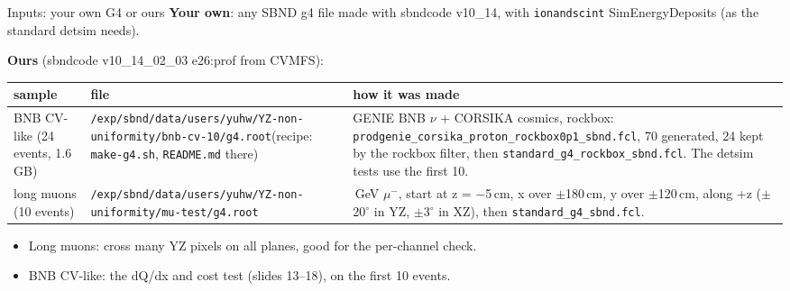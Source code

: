 \documentclass[aspectratio=169,10pt]{beamer}
\newcommand{\code}[1]{\texttt{#1}}
\begin{document}
\begin{frame}{Inputs: your own G4 or ours}
\small
\textbf{Your own}: any SBND g4 file made with sbndcode v10\_14, with \code{ionandscint} SimEnergyDeposits (as the standard detsim needs).
\vspace{2mm}

\textbf{Ours} (sbndcode v10\_14\_02\_03 e26:prof from CVMFS):
\vspace{1mm}
\centering\footnotesize
\begin{tabular}{@{}>{\raggedright\arraybackslash}p{}>{\raggedright\arraybackslash}p{}>{\raggedright\arraybackslash}p{}@{}}
\toprule
sample & file & how it was made \\
\midrule
BNB CV-like (24 events, 1.6\,GB) & \code{/exp/sbnd/data/users/yuhw/}\newline\code{YZ-non-uniformity/bnb-cv-10/g4.root}\newline(recipe: \code{make-g4.sh}, \code{README.md} there) &
GENIE BNB $\nu$ + CORSIKA cosmics, rockbox: {\scriptsize\code{prodgenie\_corsika\_proton\_rockbox0p1\_sbnd.fcl}}, 70 generated, 24 kept by the rockbox filter, then \code{standard\_g4\_rockbox\_sbnd.fcl}. The detsim tests use the first 10. \\
\addlinespace
long muons (10 events) & \code{/exp/sbnd/data/users/yuhw/}\newline\code{YZ-non-uniformity/mu-test/g4.root} &
5\,GeV $\mu^-$, start at z = $-$5\,cm, x over $\pm$180\,cm, y over $\pm$120\,cm, along +z ($\pm$20$^\circ$ in YZ, $\pm$3$^\circ$ in XZ), then \code{standard\_g4\_sbnd.fcl}. \\
\bottomrule
\end{tabular}
\raggedright\small
\vspace{2mm}
\begin{itemize}
\item Long muons: cross many YZ pixels on all planes, good for the per-channel check.
\item BNB CV-like: the dQ/dx and cost test (slides 13--18), on the first 10 events.
\end{itemize}
\end{frame}
\end{document}
